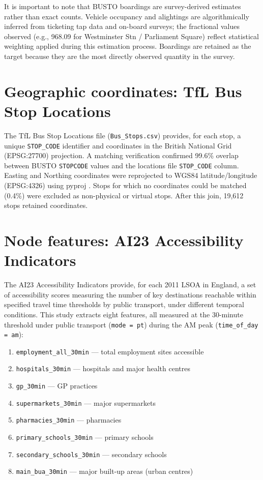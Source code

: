 \documentclass[12pt,a4paper]{report}
\begin{document}
It is important to note that BUSTO boardings are survey-derived estimates
rather than exact counts. Vehicle occupancy and alightings are algorithmically
inferred from ticketing tap data and on-board surveys; the fractional values
observed (e.g., 968.09 for Westminster Stn / Parliament Square) reflect
statistical weighting applied during this estimation process. Boardings are
retained as the target because they are the most directly observed quantity in
the survey.

\section{Geographic coordinates: TfL Bus Stop Locations}
The TfL Bus Stop Locations file (\texttt{Bus\_Stops.csv}) provides, for each
stop, a unique \texttt{STOP\_CODE} identifier and coordinates in the British
National Grid (EPSG:27700) projection. A matching verification confirmed 99.6\%
overlap between BUSTO \texttt{STOPCODE} values and the locations file
\texttt{STOP\_CODE} column. Easting and Northing coordinates were reprojected
to WGS84 latitude/longitude (EPSG:4326) using pyproj \citep{snow2023pyproj}.
Stops for which no coordinates could be matched (0.4\%) were excluded as
non-physical or virtual stops. After this join, 19,612 stops retained
coordinates.

\section{Node features: AI23 Accessibility Indicators}
\label{sec:ai23}
The AI23 Accessibility Indicators \citep{verduzco2024ai23} provide, for each
2011 LSOA in England, a set of accessibility scores measuring the number of
key destinations reachable within specified travel time thresholds by public
transport, under different temporal conditions. This study extracts eight
features, all measured at the 30-minute threshold under public transport
(\texttt{mode = pt}) during the AM peak (\texttt{time\_of\_day = am}):

\begin{enumerate}
  \item \texttt{employment\_all\_30min} --- total employment sites accessible
  \item \texttt{hospitals\_30min} --- hospitals and major health centres
  \item \texttt{gp\_30min} --- GP practices
  \item \texttt{supermarkets\_30min} --- major supermarkets
  \item \texttt{pharmacies\_30min} --- pharmacies
  \item \texttt{primary\_schools\_30min} --- primary schools
  \item \texttt{secondary\_schools\_30min} --- secondary schools
  \item \texttt{main\_bua\_30min} --- major built-up areas (urban centres)
\end{enumerate}
\end{document}
